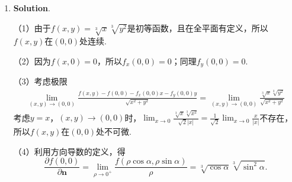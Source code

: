 \documentclass[../main.tex]{subfiles}
\begin{document}
\begin{enumerate}
    \item \textbf{Solution}.

          （1）由于$f(x,y)=\sqrt[3]{x}\sqrt[3]{y^{2}}$是初等函数，且在全平面有定义，所以$f(x,y)$在$(0,0)$处连续.

          （2）因为$f(x,0)=0$，所以$f_{x}(0,0)=0$；同理$f_{y}(0,0)=0$.

          （3）考虑极限
          \[
              \begin{aligned}
                  \lim_{(x,y)\to(0,0)}\frac{f(x,y)-f(0,0)-f_{x}(0,0)x-f_{y}(0,0)y}{\sqrt{x^{2}+y^{2}}} = \lim_{(x,y)\to(0,0)}\frac{\sqrt[3]{x}\sqrt[3]{y^{2}}}{\sqrt{x^{2}+y^{2}}}
              \end{aligned}
          \]
          考虑$y=x$，$(x,y)\to(0,0)$时，$\lim_{x\to0}\frac{\sqrt[3]{x}\sqrt[3]{x^{2}}}{\sqrt{2}|x|}=\frac{1}{\sqrt{2}}\lim_{x\to0}\frac{x}{|x|}$不存在，所以$f(x,y)$在$(0,0)$处不可微.

          （4）利用方向导数的定义，得
          \[
              \frac{\partial f(0,0)}{\partial \boldsymbol{n}}
              =\lim_{\rho\to0^{+}}\frac{f(\rho\cos\alpha,\rho\sin\alpha)}{\rho}
              =\sqrt[3]{\cos\alpha}\sqrt[3]{\sin^{2}\alpha}.
          \]
\end{enumerate}
\end{document}
